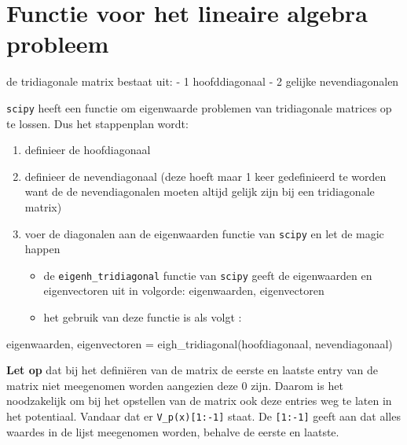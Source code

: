\documentclass[11pt]{article}
\providecommand{\tightlist}{%
      \setlength{\itemsep}{0pt}\setlength{\parskip}{0pt}}
\newenvironment{Shaded}{}{}
\newcommand{\NormalTok}[1]{{#1}}
\newcommand{\OperatorTok}[1]{\textcolor[rgb]{0.40,0.40,0.40}{{#1}}}
\begin{document}
    \hypertarget{functie-voor-het-lineaire-algebra-probleem}{%
\section{Functie voor het lineaire algebra
probleem}\label{functie-voor-het-lineaire-algebra-probleem}}

de tridiagonale matrix bestaat uit: - 1 hoofddiagonaal - 2 gelijke
nevendiagonalen

\texttt{scipy} heeft een functie om eigenwaarde problemen van
tridiagonale matrices op te lossen. Dus het stappenplan wordt:

\begin{enumerate}
\def\labelenumi{\arabic{enumi}.}
\tightlist
\item
  definieer de hoofdiagonaal
\item
  definieer de nevendiagonaal (deze hoeft maar 1 keer gedefinieerd te
  worden want de de nevendiagonalen moeten altijd gelijk zijn bij een
  tridiagonale matrix)
\item
  voer de diagonalen aan de eigenwaarden functie van \texttt{scipy} en
  let de magic happen

  \begin{itemize}
  \tightlist
  \item
    de \texttt{eigenh\_tridiagonal} functie van \texttt{scipy} geeft de
    eigenwaarden en eigenvectoren uit in volgorde: eigenwaarden,
    eigenvectoren
  \item
    het gebruik van deze functie is als volgt :
  \end{itemize}
\end{enumerate}

\begin{Shaded}
\begin{Highlighting}[]
\NormalTok{eigenwaarden, eigenvectoren }\OperatorTok{=}\NormalTok{ eigh\_tridiagonal(hoofdiagonaal, nevendiagonaal)}
\end{Highlighting}
\end{Shaded}

\textbf{Let op} dat bij het definiëren van de matrix de eerste en
laatste entry van de matrix niet meegenomen worden aangezien deze 0
zijn. Daarom is het noodzakelijk om bij het opstellen van de matrix ook
deze entries weg te laten in het potentiaal. Vandaar dat er
\texttt{V\_p(x){[}1:-1{]}} staat. De \texttt{{[}1:-1{]}} geeft aan dat
alles waardes in de lijst meegenomen worden, behalve de eerste en
laatste.
\end{document}
